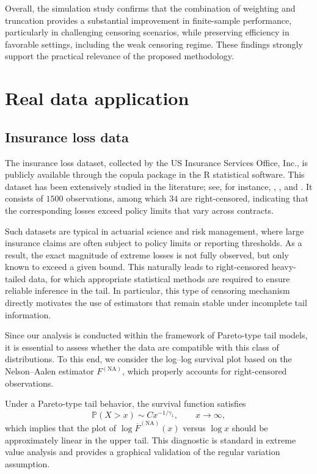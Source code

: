 \documentclass[reqno,openbib,runningheads,a4paper,12pt]{amsart}%
\begin{document}
\noindent Overall, the simulation study confirms that the combination of
weighting and truncation provides a substantial improvement in finite-sample
performance, particularly in challenging censoring scenarios, while preserving
efficiency in favorable settings, including the weak censoring regime. These
findings strongly support the practical relevance of the proposed methodology.

\section{\textbf{Real data application\label{sec4}}}

\subsection{Insurance loss data}

\noindent The insurance loss dataset, collected by the US Insurance Services
Office, Inc., is publicly available through the copula package in the R
statistical software. This dataset has been extensively studied in the
literature; see, for instance, \cite{FV98}, \cite{Klugman99}, and
\cite{DPV06}. It consists of $1500$ observations, among which $34$ are
right-censored, indicating that the corresponding losses exceed policy limits
that vary across contracts.\smallskip

\noindent Such datasets are typical in actuarial science and risk management,
where large insurance claims are often subject to policy limits or reporting
thresholds. As a result, the exact magnitude of extreme losses is not fully
observed, but only known to exceed a given bound. This naturally leads to
right-censored heavy-tailed data, for which appropriate statistical methods
are required to ensure reliable inference in the tail. In particular, this
type of censoring mechanism directly motivates the use of estimators that
remain stable under incomplete tail information.\smallskip

\noindent Since our analysis is conducted within the framework of Pareto-type
tail models, it is essential to assess whether the data are compatible with
this class of distributions. To this end, we consider the log--log survival
plot based on the Nelson--Aalen estimator $F^{(\mathrm{NA})}$, which properly
accounts for right-censored observations.\smallskip

\noindent Under a Pareto-type tail behavior, the survival function satisfies
\[
\mathbb{P}(X>x)\sim Cx^{-1/\gamma_{1}},\qquad x\rightarrow\infty,
\]
which implies that the plot of $\log\overline{F}^{(\mathrm{NA})}(x)$ versus
$\log x$ should be approximately linear in the upper tail. This diagnostic is
standard in extreme value analysis and provides a graphical validation of the
regular variation assumption.\smallskip
\end{document}
